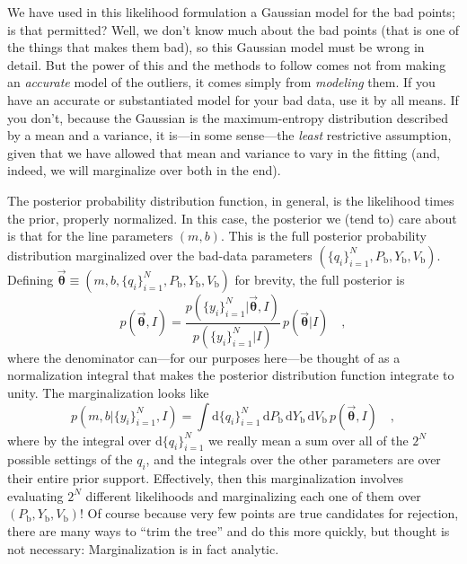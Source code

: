 \documentclass[12pt,twoside]{article}
\newcommand{\mmatrix}[1]{\boldsymbol{#1}}
\newcommand{\parametervector}[1]{\mmatrix{\vec{#1}}}
\newcommand{\pvtheta}{\parametervector{\theta}}
\newcommand{\setofall}[3]{\{{#1}\}_{{#2}}^{{#3}}}
\newcommand{\allq}{\setofall{q_i}{i=1}{N}}
\newcommand{\ally}{\setofall{y_i}{i=1}{N}}
\renewcommand{\d}{\mathrm{d}}
\newcommand{\Pbad}{P_{\mathrm{b}}}
\newcommand{\Ybad}{Y_{\mathrm{b}}}
\newcommand{\Vbad}{V_{\mathrm{b}}}
\begin{document}
We have used in this likelihood formulation a Gaussian model for the
bad points; is that permitted?  Well, we don't know much about the bad
points (that is one of the things that makes them bad), so this
Gaussian model must be wrong in detail.  But the power of this and the
methods to follow comes not from making an \emph{accurate} model of
the outliers, it comes simply from \emph{modeling} them.  If you have
an accurate or substantiated model for your bad data, use it by all
means.  If you don't, because the Gaussian is the maximum-entropy
distribution described by a mean and a variance, it is---in
some sense---the \emph{least} restrictive assumption, given that we
have allowed that mean and variance to vary in the fitting (and,
indeed, we will marginalize over both in the end).

The posterior probability distribution function, in general, is the
likelihood times the prior, properly normalized.  In this case, the
posterior we (tend to) care about is that for the line parameters
$(m,b)$.  This is the full posterior probability distribution
marginalized over the bad-data parameters $(\allq,\Pbad,\Ybad,\Vbad)$.
Defining $\pvtheta\equiv(m,b,\allq,\Pbad,\Ybad,\Vbad)$ for brevity, the
full posterior is
\begin{equation}
p(\pvtheta,I) =
 \frac{p(\ally|\pvtheta,I)}{p(\ally|I)}
 \,p(\pvtheta|I)
 \quad,
\end{equation}
where the denominator can---for our purposes here---be thought of as a
normalization integral that makes the posterior distribution function
integrate to unity.  The marginalization looks like
\begin{equation}
p(m,b|\ally,I)=\int \d\allq\,\d\Pbad\,\d\Ybad\,\d\Vbad
 \,p(\pvtheta,I) \quad,
\end{equation}
where by the integral over $\d\allq$ we really mean a sum over all of
the $2^N$ possible settings of the $q_i$, and the integrals over the
other parameters are over their entire prior support.  Effectively,
then this marginalization involves evaluating $2^N$ different
likelihoods and marginalizing each one of them over
$(\Pbad,\Ybad,\Vbad)$!  Of course because very few points are true
candidates for rejection, there are many ways to ``trim the tree'' and
do this more quickly, but thought is not necessary: Marginalization is
in fact analytic.
\end{document}

